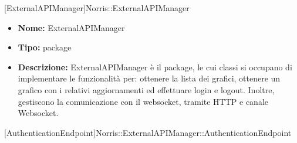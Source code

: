 \begin{itemize}
			\end{itemize}

			
			[ExternalAPIManager]{Norris::ExternalAPIManager}
			

	

			\begin{itemize}
			\item \textbf{Nome:} ExternalAPIManager
			\item \textbf{Tipo:} package
			
			\item \textbf{Descrizione:} ExternalAPIManager è il package, le cui classi si occupano di implementare le funzionalità per: ottenere la lista dei grafici, ottenere un grafico con i relativi aggiornamenti ed effettuare login e logout. Inoltre, gestiscono la comunicazione con il websocket, tramite HTTP e canale Websocket.
			\end{itemize}

			
			[AuthenticationEndpoint]{Norris::ExternalAPIManager::AuthenticationEndpoint}
			

	
